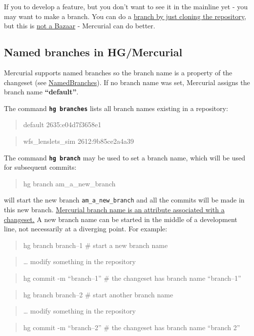 If you to develop a feature, but you don't want to see it in the
mainline yet - you may want to make a branch. You can do a
\href{http://stevelosh.com/blog/2009/08/a-guide-to-branching-in-mercurial/}{branch by just cloning the repository},
but this is
\href{http://solovyov.net/blog/2011/bzr-hate-and-hate/}{not a Bazaar}
- Mercurial can do better.

\subsection{Named branches in HG/Mercurial}

Mercurial supports named branches so the branch name is a property
of the changeset (see
\href{http://mercurial.selenic.com/wiki/NamedBranches}{NamedBranches}).
If no branch name was set, Mercurial assigns the branch name
\textbf{``default''}.

The command \textbf{\texttt{hg branches}} lists all branch names
existing in a repository:

\begin{quote}
default 2635:e04d7f3658e1

\end{quote}
\begin{quote}
wfs\_lenslets\_sim 2612:9b85ce2a4a39

\end{quote}
The command \textbf{\texttt{hg branch}} may be used to set a branch
name, which will be used for subsequent commits:

\begin{quote}
hg branch am\_a\_new\_branch

\end{quote}
will start the new branch \verb!am_a_new_branch! and all the
commits will be made in this new branch.
\href{http://mercurial.selenic.com/wiki/Branch}{Mercurial branch name is an attribute associated with a changeset.}
A new branch name can be started in the middle of a development
line, not necessarily at a diverging point. For example:

\begin{quote}
hg branch branch--1 \# start a new branch name

\end{quote}
\begin{quote}
\ldots{} modify something in the repository

\end{quote}
\begin{quote}
hg commit -m ``branch--1'' \# the changeset has branch name
``branch--1''

\end{quote}
\begin{quote}
hg branch branch--2 \# start another branch name

\end{quote}
\begin{quote}
\ldots{} modify something in the repository

\end{quote}
\begin{quote}
hg commit -m ``branch--2'' \# the changeset has branch name
``branch 2''

\end{quote}
